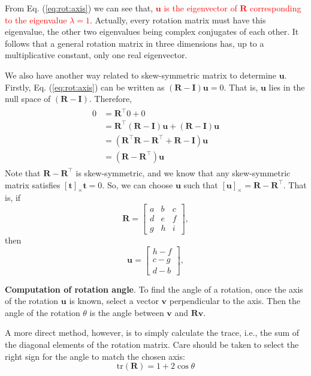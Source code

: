 \documentclass[12pt]{article}
\numberwithin{equation}{section}
\begin{document}
From Eq. (\ref{eq:rot:axis}) we can see that,  \textcolor{red}{$\mathbf{u}$ is the eigenvector of $\mathbf{R}$ corresponding to the eigenvalue $\lambda = 1$}. Actually, every rotation matrix must have this eigenvalue, the other two eigenvalues being complex conjugates of each other. It follows that a general rotation matrix in three dimensions has, up to a multiplicative constant, only one real eigenvector.

We also have another way related to skew-symmetric matrix to determine $\mathbf{u}$. Firstly, Eq. (\ref{eq:rot:axis}) can be written as $\mathbf{(R-I)u} = 0$. That is, $\mathbf{u}$ lies in the null space of $\mathbf{(R-I)}$. Therefore,
%
\begin{align*}
\begin{split}
0 &= \mathbf{R}^\top 0 + 0 \\
&= \mathbf{R}^\top \mathbf{(R - I)u} + \mathbf{(R - I)u} \\
&=(\mathbf{R}^\top \mathbf{R} - \mathbf{R}^\top + \mathbf{R - I}) \mathbf{u} \\
& = (\mathbf{R} - \mathbf{R}^\top)\mathbf{u}
\end{split}
\end{align*}
Note that $\mathbf{R} - \mathbf{R}^\top$ is skew-symmetric, and we know that any skew-symmetric matrix satisfies $[\mathbf{t}]_{\times}\mathbf{t} = 0$. So, we can choose $\mathbf{u}$ such that $[\mathbf{u}]_{\times} = \mathbf{R} - \mathbf{R}^\top$.  That is, if
\begin{equation*}
\mathbf{R} =
\begin{bmatrix}
a & b & c \\
d & e & f\\
g & h & i
\end{bmatrix},
\end{equation*}
then
\begin{equation*}
\mathbf{u} =
\begin{bmatrix}
h-f\\
c-g\\
d-b
\end{bmatrix},
\end{equation*}

\textbf{Computation of rotation angle}. To find the angle of a rotation, once the axis of the rotation $\mathbf{u}$ is known, select a vector $\mathbf{v}$ perpendicular to the axis. Then the angle of the rotation $\theta$ is the angle between $\mathbf{v}$ and $\mathbf{Rv}$.

A more direct method, however, is to simply calculate the trace, i.e., the sum of the diagonal elements of the rotation matrix. Care should be taken to select the right sign for the angle to match the chosen axis:
\begin{equation}
\text{tr}(\mathbf{R}) = 1 + 2\cos\theta
\label{eq:rot:angle}
\end{equation}
\end{document}
